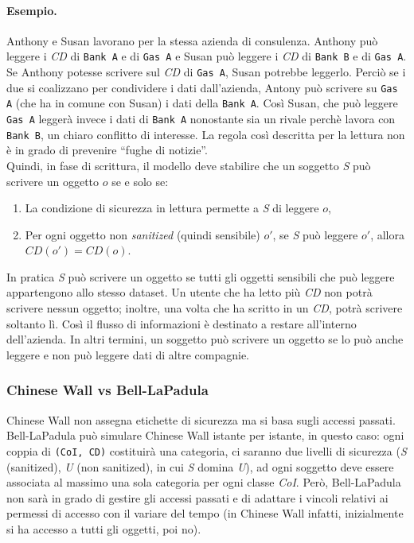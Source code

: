 \paragraph{Esempio.}
Anthony e Susan lavorano per la stessa azienda di consulenza.
Anthony può leggere i \textit{CD} di \verb|Bank A| e di \verb|Gas A| e Susan
può leggere i \textit{CD} di \verb|Bank B| e di \verb|Gas A|. Se Anthony potesse
scrivere sul \textit{CD} di \verb|Gas A|, Susan potrebbe leggerlo. Perciò se i due si coalizzano per condividere i dati dall'azienda, Antony può scrivere su \verb|Gas A| (che ha in comune con Susan) i dati della \verb|Bank A|. Così Susan, che può leggere \verb|Gas A| leggerà invece i dati di \verb|Bank A| nonostante sia un rivale perchè lavora con \verb|Bank B|, un chiaro conflitto di interesse. La regola così descritta per la lettura non è in grado di prevenire ``fughe di notizie''.\\

Quindi, in fase di scrittura, il modello deve stabilire che un soggetto \textit{S}
può scrivere un oggetto \(o\) se e solo se:

\begin{enumerate}
    \item La condizione di sicurezza in lettura permette a \textit{S} di
          leggere \(o\),
    \item Per ogni oggetto non \textit{sanitized} (quindi sensibile) \(o'\),
          se \textit{S} può leggere \(o'\), allora \(CD(o') = CD(o)\).
\end{enumerate}

In pratica \textit{S} può scrivere un oggetto se tutti gli oggetti sensibili
che può leggere appartengono allo stesso dataset. Un utente che ha letto più
\textit{CD} non potrà scrivere nessun oggetto; inoltre, una volta
che ha scritto in un \textit{CD}, potrà scrivere soltanto lì.
Così il flusso di informazioni è destinato a restare all'interno dell'azienda.
In altri termini, un
soggetto può scrivere un oggetto se lo può anche leggere e non può leggere dati
di altre compagnie.

\subsubsection{Chinese Wall vs Bell-LaPadula}

Chinese Wall non assegna etichette di sicurezza
ma si basa sugli accessi passati. Bell-LaPadula può
simulare Chinese Wall istante per istante, in questo
caso: ogni coppia di \verb|(CoI, CD)| costituirà una
categoria, ci saranno due livelli di sicurezza (\textit{S}
(sanitized), \textit{U} (non sanitized), in cui \textit{S} domina \textit{U}),
ad ogni soggetto deve essere associata al massimo
una sola categoria per ogni classe \textit{CoI}. Però,
Bell-LaPadula non sarà in grado di gestire gli
accessi passati e di adattare i vincoli relativi ai
permessi di accesso con il variare del tempo (in
Chinese Wall infatti, inizialmente si ha accesso a
tutti gli oggetti, poi no).

